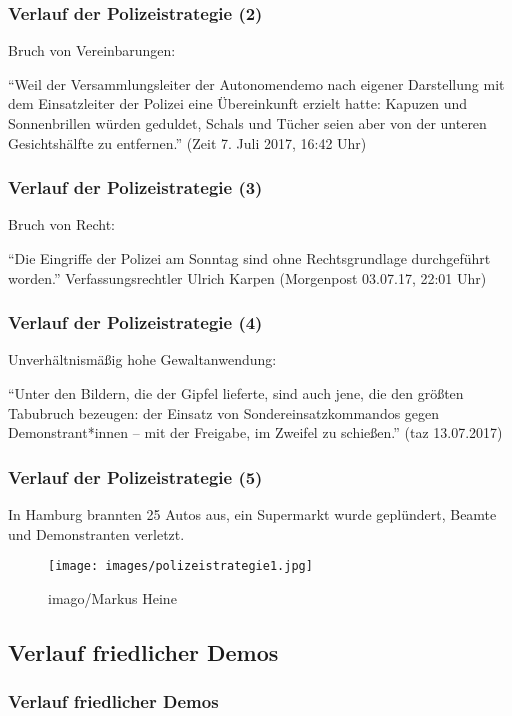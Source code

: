 \documentclass[]{beamer}
\begin{document}
	\begin{frame}
	\frametitle{Verlauf der Polizeistrategie (2)}
	Bruch von Vereinbarungen:\par 
	\enquote{Weil der Versammlungsleiter der Autonomendemo nach eigener Darstellung mit dem Einsatzleiter der Polizei eine Übereinkunft erzielt hatte: Kapuzen und Sonnenbrillen würden geduldet, Schals und Tücher seien aber von der unteren Gesichtshälfte zu entfernen.} (Zeit 7. Juli 2017, 16:42 Uhr)
\end{frame}

	\begin{frame}
	\frametitle{Verlauf der Polizeistrategie (3)}
	Bruch von Recht:\par 
	\enquote{Die Eingriffe der Polizei am Sonntag sind ohne Rechtsgrundlage durchgeführt worden.} Verfassungsrechtler Ulrich Karpen (Morgenpost 03.07.17, 22:01 Uhr)
\end{frame}

	\begin{frame}
	\frametitle{Verlauf der Polizeistrategie (4)}
	Unverhältnismäßig hohe Gewaltanwendung:\par 
	\enquote{Unter den Bildern, die der Gipfel lieferte, sind auch jene, die den größten Tabubruch bezeugen: der Einsatz von Sondereinsatzkommandos gegen Demonstrant*innen – mit der Freigabe, im Zweifel zu schießen.} (taz 13.07.2017)
\end{frame}

	\begin{frame}
	\frametitle{Verlauf der Polizeistrategie (5)}
		In Hamburg brannten 25 Autos aus, ein Supermarkt wurde geplündert, Beamte und Demonstranten verletzt.
	\begin{figure}
		\renewcommand{\figurename}{Foto} 
		\texttt{[image: images/polizeistrategie1.jpg]}
		\caption{imago/Markus Heine}
	\end{figure}
\end{frame}

	\begin{frame}
	\subsection{Verlauf friedlicher Demos}
	\frametitle{Verlauf friedlicher Demos}
\end{frame}
\end{document}
